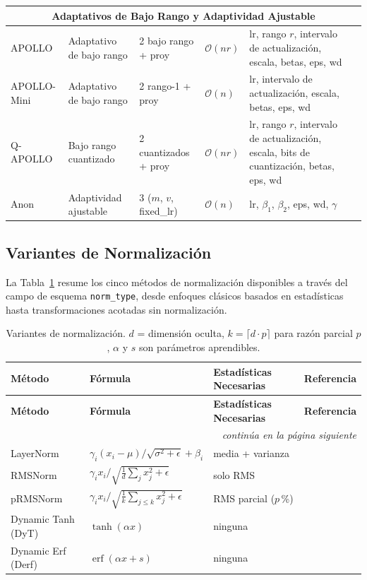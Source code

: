 \begin{longtable}{p{2.0cm}p{2.0cm}p{2.2cm}p{2.0cm}p{3.8cm}p{2.5cm}}
\multicolumn{6}{c}{\textbf{Adaptativos de Bajo Rango y Adaptividad Ajustable}} \\
\midrule
APOLLO & Adaptativo de bajo rango & 2 bajo rango + proy & $\mathcal{O}(n r)$ & lr, rango $r$, intervalo de actualización, escala, betas, eps, wd & \citep{zhu2025apollosgdlikememoryadamwlevel} \\
APOLLO-Mini & Adaptativo de bajo rango & 2 rango-1 + proy & $\mathcal{O}(n)$ & lr, intervalo de actualización, escala, betas, eps, wd & \citep{zhu2025apollosgdlikememoryadamwlevel} \\
Q-APOLLO & Bajo rango cuantizado & 2 cuantizados + proy & $\mathcal{O}(n r)$ & lr, rango $r$, intervalo de actualización, escala, bits de cuantización, betas, eps, wd & \citep{zhu2025apollosgdlikememoryadamwlevel} \\
Anon & Adaptividad ajustable & 3 ($m$, $v$, fixed\_lr) & $\mathcal{O}(n)$ & lr, $\beta_1$, $\beta_2$, eps, wd, $\gamma$ & \citep{anon2026anon} \\
\bottomrule
\end{longtable}
\normalsize

\subsection{Variantes de Normalización}

La Tabla~\ref{tab:all-norms} resume los cinco métodos de normalización disponibles a través del campo de esquema \texttt{norm\_type}, desde enfoques clásicos basados en estadísticas hasta transformaciones acotadas sin normalización.

\small
\begin{longtable}{p{2.5cm}p{5.5cm}p{2.5cm}p{3.5cm}}
\toprule
\textbf{Método} & \textbf{Fórmula} & \textbf{Estadísticas Necesarias} & \textbf{Referencia} \\
\midrule
\endfirsthead
\toprule
\textbf{Método} & \textbf{Fórmula} & \textbf{Estadísticas Necesarias} & \textbf{Referencia} \\
\midrule
\endhead
\midrule
\multicolumn{4}{r}{\textit{continúa en la página siguiente}} \\
\endfoot
\bottomrule
\caption{Variantes de normalización. $d$ = dimensión oculta, $k = \lceil d \cdot p \rceil$ para razón parcial $p$, $\alpha$ y $s$ son parámetros aprendibles.}
\label{tab:all-norms}
\endlastfoot
LayerNorm & $\gamma_i (x_i - \mu)/\sqrt{\sigma^2 + \epsilon} + \beta_i$ & media + varianza & \citep{ba2016layer} \\
RMSNorm & $\gamma_i x_i / \sqrt{\frac{1}{d}\sum_j x_j^2 + \epsilon}$ & solo RMS & \citep{zhang_root_2019} \\
pRMSNorm & $\gamma_i x_i / \sqrt{\frac{1}{k}\sum_{j \le k} x_j^2 + \epsilon}$ & RMS parcial ($p$\,\%) & \citep{zhang_root_2019} \\
Dynamic Tanh (DyT) & $\tanh(\alpha x)$ & ninguna & \citep{zhu_transformers_2025} \\
Dynamic Erf (Derf) & $\operatorname{erf}(\alpha x + s)$ & ninguna & \citep{chen_stronger_2025} \\
\bottomrule
\end{longtable}
\normalsize

